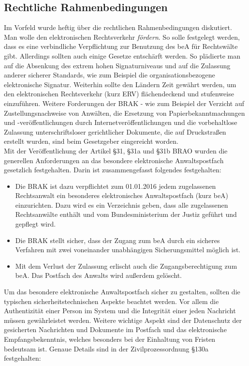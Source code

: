\subsection{Rechtliche Rahmenbedingungen}
Im Vorfeld wurde heftig über die rechtlichen Rahmenbedingungen diskutiert. Man wolle den elektronischen Rechtsverkehr \textit{fördern}. So solle festgelegt werden, dass es eine verbindliche Verpflichtung zur Benutzung des beA für Rechtswälte gibt. Allerdings sollten auch einige Gesetze entschärft werden. So plädierte man auf die Absenkung des extrem hohen Signaturniveaus und auf die Zulassung anderer sicherer Standards, wie zum Beispiel die organisationsbezogene elektronische Signatur. Weiterhin sollte den Ländern Zeit gewährt werden, um den elektronischen Rechtsverkehr (kurz ERV) flächendeckend und stufenweise einzuführen. Weitere Forderungen der BRAK - wie zum Beispiel der Verzicht auf Zustellungsnachweise von Anwälten, die Ersetzung von Papierbekanntmachungen und -veröffentlichungen durch Internetveröffentlichungen und die vorbehaltlose Zulassung unterschriftsloser gerichtlicher Dokumente, die auf Druckstraßen erstellt wurden, sind beim Gesetzgeber eingereicht worden. \\
Mit der Veröffentlichung der Artikel §31, §31a und §31b BRAO wurden die generellen Anforderungen an das besondere elektronische Anwaltspostfach gesetzlich festgehalten. Darin ist zusammengefasst folgendes festgehalten:
\begin{itemize}
	\item Die BRAK ist dazu verpflichtet zum 01.01.2016 jedem zugelassenen Rechtsanwalt ein besonderes elektronisches Anwaltspostfach (kurz beA) einzurichten. Dazu wird es ein Verzeichnis geben, dass alle zugelassenen Rechtsanwälte enthält und vom Bundesministerium der Justiz geführt und gepflegt wird.
	\item Die BRAK stellt sicher, dass der Zugang zum beA durch ein sicheres Verfahren mit zwei voneinander unabhängigen Sicherungsmittel möglich ist.
	\item Mit dem Verlust der Zulassung erlischt auch die Zugangsberechtigung zum beA. Das Postfach des Anwalts wird außerdem gelöscht.
\end{itemize}

Um das besondere elektronische Anwaltspostfach sicher zu gestalten, sollten die typischen sicherheitstechnischen Aspekte beachtet werden. Vor allem die Authentizität einer Person im System und die Integrität einer jeden Nachricht müssen gewährleistet werden. Weitere wichtige Aspekt sind der Datenschutz der gesicherten Nachrichten und Dokumente im Postfach und das elektronische Empfangsbekenntnis, welches besonders bei der Einhaltung von Fristen bedeutsam ist. Genaue Details sind in der Zivilprozessordnung §130a festgehalten:

